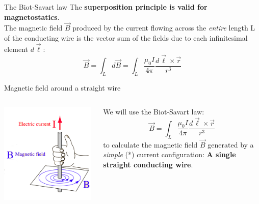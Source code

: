 \begin{frame}{The Biot-Savart law}
The {\bf superposition principle is valid for magnetostatics}.\\
The magnetic field $\vec{B}$ produced by the current flowing across the {\em entire} length L
of the conducting wire is the vector sum of the fields due to each
infinitesimal element $d\vec{\ell}$:
\begin{equation*}
       \vec{B} = \int_{L} d\vec{B} = \int_{L} \frac{\mu_0I}{4\pi} \frac{d\vec{\ell} \times \vec{r}}{r^3}
\end{equation*}

\end{frame}


%
%
%

\begin{frame}{Magnetic field around a straight wire}

\begin{columns}
  \begin{column}{0.50\textwidth}
    \includegraphics[width=0.98\textwidth]{./images/schematics/magnetic_field_around_wire_01.png}
  \end{column}
  \begin{column}{0.50\textwidth}
    We will use the Biot-Savart law:
    \begin{equation*}
       \vec{B} = \int_{L} \frac{\mu_0I}{4\pi} \frac{d\vec{\ell} \times \vec{r}}{r^3}
      \end{equation*}
      to calculate the magnetic field $\vec{B}$
      generated by a {\em simple} (*) current configuration:
      {\bf A single straight conducting wire}.
  \end{column}
\end{columns}


\end{frame}
